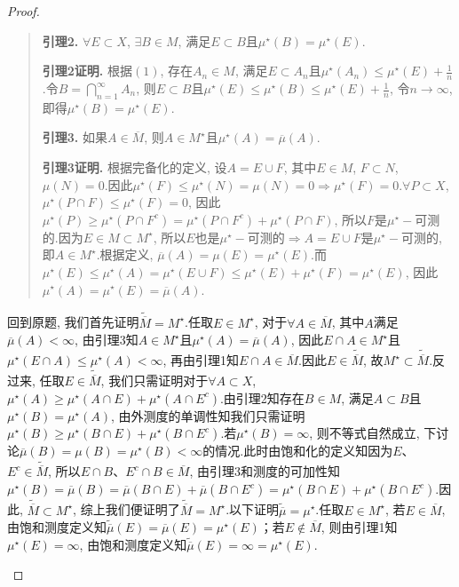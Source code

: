 \documentclass[lang=cn,12pt,a4paper]{elegantpaper.cls}
\begin{document}
\begin{enumerate}
\begin{proof}
\begin{enumerate}[(1)]
\begin{quote}
				\textbf{引理2.} $\forall{E}\subset{X}$, $\exists{B\in{M}}$, 满足$E\subset{B}$且$\mu^{\star}(B)=\mu^{\star}(E)$.
				
				\textbf{引理2证明.} 根据$(1)$, 存在$A_n\in{M}$, 满足$E\subset{A_n}$且$\mu^{\star}(A_n)\leq\mu^{\star}(E)+\frac{1}{n}$.令$B=\bigcap\limits_{n=1}^{\infty}A_n$, 则$E\subset{B}$且$\mu^{\star}(E)\leq\mu^{\star}(B)\leq\mu^{\star}(E)+\frac{1}{n}$, 令$n\rightarrow\infty$, 即得$\mu^{\star}(B)=\mu^{\star}(E)$.
				
				\textbf{引理3.} 如果$A\in\overline{M}$, 则$A\in{M^{\star}}$且$\mu^{\star}(A)=\overline{\mu}(A)$.
				
				\textbf{引理3证明.} 根据完备化的定义, 设$A=E\cup{F}$, 其中$E\in{M}$, $F\subset{N}$, $\mu(N)=0$.因此$\mu^{\star}(F)\leq\mu^{\star}(N)=\mu(N)=0\Longrightarrow\mu^{\star}(F)=0$.$\forall{P\subset{X}}$, $\mu^{\star}(P\cap{F})\leq\mu^{\star}(F)=0$, 因此$\mu^{\star}(P)\geqslant\mu^{\star}(P\cap{F^{c}})=\mu^{\star}(P\cap{F^{c}})+\mu^{\star}(P\cap{F})$, 所以$F$是$\mu^{\star}-$可测的.因为$E\in{M}\subset{M^{\star}}$, 所以$E$也是$\mu^{\star}-$可测的$\Longrightarrow{A=E\cup{F}}$是$\mu^{\star}-$可测的, 即$A\in{M^{\star}}$.根据定义, ${\overline\mu}(A)=\mu(E)=\mu^{\star}(E)$.而$\mu^{\star}(E)\leq\mu^{\star}(A)=\mu^{\star}(E\cup{F})\leq\mu^{\star}(E)+\mu^{\star}(F)=\mu^{\star}(E)$, 因此$\mu^{\star}(A)=\mu^{\star}(E)=\overline{\mu}(A)$.
			\end{quote}

			回到原题, 我们首先证明$\widetilde{\overline{M}}=M^{\star}$.任取$E\in{M^{\star}}$, 对于$\forall{A}\in{\overline{M}}$, 其中$A$满足$\overline{\mu}(A)<\infty$, 由引理3知$A\in{M^{\star}}$且$\mu^{\star}(A)=\overline{\mu}(A)$, 因此$E\cap{A}\in{M^{\star}}$且$\mu^{\star}(E\cap{A})\leq\mu^{\star}(A)<\infty$, 再由引理1知$E\cap{A}\in{\overline{M}}$.因此$E\in{\widetilde{\overline{M}}}$, 故$M^{\star}\subset{\widetilde{\overline{M}}}$.反过来, 任取$E\in{\widetilde{\overline{M}}}$, 我们只需证明对于$\forall{A\subset{X}}$, $\mu^{\star}(A)\geqslant\mu^{\star}(A\cap{E})+\mu^{\star}(A\cap{E^{c}})$.由引理2知存在$B\in{M}$, 满足$A\subset{B}$且$\mu^{\star}(B)=\mu^{\star}(A)$, 由外测度的单调性知我们只需证明$\mu^{\star}(B)\geqslant\mu^{\star}(B\cap{E})+\mu^{\star}(B\cap{E^{c}})$.若$\mu^{\star}(B)=\infty$, 则不等式自然成立, 下讨论$\overline{\mu}(B)=\mu(B)=\mu^{\star}(B)<\infty$的情况.此时由饱和化的定义知因为$E$、$E^{c}\in{\widetilde{\overline{M}}}$, 所以$E\cap{B}$、$E^{c}\cap{B}\in{\overline{M}}$, 由引理3和测度的可加性知$\mu^{\star}(B)=\overline{\mu}(B)=\overline{\mu}(B\cap{E})+\overline{\mu}(B\cap{E^{c}})=\mu^{\star}(B\cap{E})+\mu^{\star}(B\cap{E^{c}})$.因此, $\widetilde{\overline{M}}\subset{M^{\star}}$, 综上我们便证明了$\widetilde{\overline{M}}=M^{\star}$.以下证明$\widetilde{\overline{\mu}}=\mu^{\star}$.任取$E\in{M^{\star}}$, 若$E\in{\overline{M}}$, 由饱和测度定义知$\widetilde{\overline{\mu}}(E)=\overline{\mu}(E)=\mu^{\star}(E)$；若$E\notin{\overline{M}}$, 则由引理1知$\mu^{\star}(E)=\infty$, 由饱和测度定义知$\widetilde{\overline{\mu}}(E)=\infty=\mu^{\star}(E)$.
		\end{enumerate}
		

\end{proof}
\end{enumerate}
\end{document}
